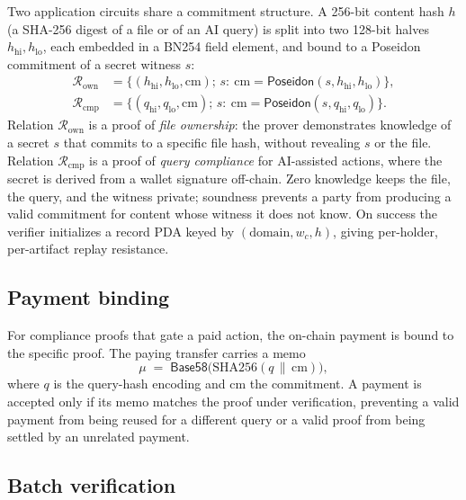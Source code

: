 \documentclass[conference]{IEEEtran}
\begin{document}
Two application circuits share a commitment structure. A 256-bit content hash
$h$ (a SHA-256 digest of a file or of an AI query) is split into two 128-bit
halves $h_{\mathrm{hi}}, h_{\mathrm{lo}}$, each embedded in a BN254 field
element, and bound to a Poseidon \cite{poseidon} commitment of a secret
witness $s$:
\begin{align}
\mathcal{R}_{\mathrm{own}} &= \big\{ (h_{\mathrm{hi}}, h_{\mathrm{lo}},
\mathrm{cm});\, s :\ \mathrm{cm} = \mathsf{Poseidon}(s, h_{\mathrm{hi}},
h_{\mathrm{lo}}) \big\}, \\
\mathcal{R}_{\mathrm{cmp}} &= \big\{ (q_{\mathrm{hi}}, q_{\mathrm{lo}},
\mathrm{cm});\, s :\ \mathrm{cm} = \mathsf{Poseidon}(s, q_{\mathrm{hi}},
q_{\mathrm{lo}}) \big\}.
\end{align}
Relation $\mathcal{R}_{\mathrm{own}}$ is a proof of \emph{file ownership}: the
prover demonstrates knowledge of a secret $s$ that commits to a specific file
hash, without revealing $s$ or the file. Relation $\mathcal{R}_{\mathrm{cmp}}$
is a proof of \emph{query compliance} for AI-assisted actions, where the
secret is derived from a wallet signature off-chain. Zero knowledge keeps the
file, the query, and the witness private; soundness prevents a party from
producing a valid commitment for content whose witness it does not know. On
success the verifier initializes a record PDA keyed by
$(\text{domain}, w_c, h)$, giving per-holder, per-artifact replay resistance.

\subsection{Payment binding}

For compliance proofs that gate a paid action, the on-chain payment is bound
to the specific proof. The paying transfer carries a memo
\begin{equation}
\mu \;=\; \mathsf{Base58}\big(\mathrm{SHA256}(q \,\|\, \mathrm{cm})\big),
\end{equation}
where $q$ is the query-hash encoding and $\mathrm{cm}$ the commitment. A
payment is accepted only if its memo matches the proof under verification,
preventing a valid payment from being reused for a different query or a valid
proof from being settled by an unrelated payment.

\subsection{Batch verification}
\end{document}
